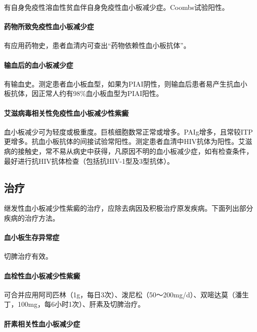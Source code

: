 有自身免疫性溶血性贫血伴自身免疫性血小板减少症。Coombs试验阳性。

\paragraph{药物所致免疫性血小板减少症}

有应用药物史，患者血清内可查出“药物依赖性血小板抗体”。

\paragraph{输血后的血小板减少症}

有输血史。测定患者血小板血型，如果为PIAI阴性，则输血后患者易产生抗血小板抗体，因正常人约有98\%血小板血型为PIAI阳性。

\paragraph{艾滋病毒相关性免疫性血小板减少性紫癜}

血小板减少可为轻度或极重度。巨核细胞数常正常或增多。PAIg增多，且常较ITP更增多。抗血小板抗体的间接试验常阳性。测定患者血清中HIV抗体为阳性。艾滋病的接触史，常不易从病史中获得，凡原因不明的血小板减少症，如有检查条件，最好进行抗HIV抗体检查（包括抗HIV-1型及3型抗体）。

\subsection{治疗}

继发性血小板减少性紫癜的治疗，应除去病因及积极治疗原发疾病。下面列出部分疾病的治疗方法。

\paragraph{血小板生存异常症}

切脾治疗有效。

\paragraph{血栓性血小板减少性紫癜}

可合并应用阿司匹林（1g，每日3次）、泼尼松（50～200mg/d）、双嘧达莫（潘生丁，100mg，每6小时1次）、肝素及切脾治疗。

\paragraph{肝素相关性血小板减少症}

